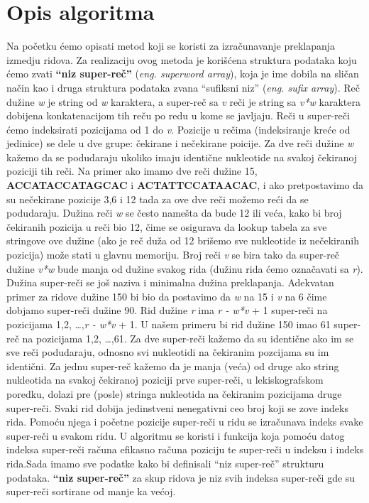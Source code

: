 \documentclass[a4paper]{article}
\begin{document}
{\section{Opis algoritma}
\label{opis_algoritma}
Na početku ćemo opisati metod koji se koristi za izračunavanje preklapanja izmedju ridova. Za realizaciju ovog metoda je korišćena struktura podataka koju ćemo zvati \textbf{``niz super-reč''} (\textit{eng. superword array}), koja je ime dobila na sličan način kao i druga struktura podataka zvana ``sufiksni niz'' (\textit{eng. sufix array}). Reč dužine \textit{w} je string od \textit{w} karaktera, a super-reč sa \textit{v} reči je string sa \textit{v*w} karaktera dobijena konkatenacijom tih reču po redu u kome se javljaju. Reči u super-reči ćemo indeksirati pozicijama od 1 do \textit{v}. Pozicije u rečima (indeksiranje kreće od jedinice) se dele u dve grupe: čekirane i nečekirane poicije. Za dve reči dužine \textit{w} kažemo da se podudaraju ukoliko imaju identične nukleotide na svakoj čekiranoj poziciji tih reči. Na primer ako imamo dve reči dužine 15, \textbf{ACCATACCATAGCAC} i \textbf{ACTATTCCATAACAC}, i ako pretpostavimo da su nečekirane pozicije 3,6 i 12 tada za ove dve reči možemo reći da se podudaraju. Dužina reči \textit{w} se često namešta da bude 12 ili veća, kako bi broj čekiranih pozicija u reči bio 12, čime se osigurava da lookup tabela za sve stringove ove dužine (ako je reč duža od 12 brišemo sve nukleotide iz nečekiranih pozicija) može stati u glavnu memoriju. Broj reči \textit{v} se bira tako da super-reč dužine \textit{v*w} bude manja od dužine svakog rida (dužinu rida ćemo označavati sa  \textit{r}). Dužina super-reči se još naziva i minimalna dužina preklapanja. Adekvatan primer za ridove dužine 150 bi bio da postavimo da \textit{w} na 15 i \textit{v} na 6 čime dobjamo super-reči dužine 90. Rid dužine \textit{r} ima \textit{r - w*v }+ 1 super-reči na pozicijama 1,2, \ldots ,\textit{r - w*v }+ 1. U našem primeru bi rid dužine 150 imao 61 super-reč na pozicijama 1,2, \ldots ,61. Za dve super-reči kažemo da su identične ako im se sve reči podudaraju, odnosno svi nukleotidi na čekiranim pozcijama su im identični. Za jednu super-reč kažemo da je manja (veća) od druge ako string nukleotida na svakoj čekiranoj poziciji prve super-reči, u lekiskografskom poredku, dolazi pre (posle) stringa nukleotida na čekiranim pozicijama druge super-reči. Svaki rid dobija jedinstveni nenegativni ceo broj koji se zove indeks rida. Pomoću njega i početne pozicije super-reči u ridu se izračunava indeks svake super-reči u svakom ridu. U algoritmu se koristi i funkcija koja pomoću datog indeksa super-reči računa efikasno računa poziciju te super-reči u indeksu i indeks rida.Sada imamo sve podatke kako bi definisali ``niz super-reč'' strukturu podataka. \textbf{``niz super-reč''} za skup ridova je niz svih indeksa super-reči gde su super-reči sortirane od manje ka većoj.

}
\end{document}
